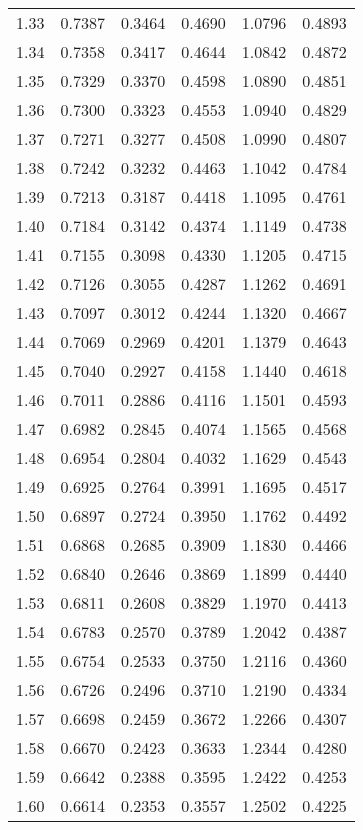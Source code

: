 \documentclass{article}
\begin{document}
\begin{longtable}{cccccc}
1.33 & 0.7387 & 0.3464 & 0.4690 & 1.0796 & 0.4893 \\
1.34 & 0.7358 & 0.3417 & 0.4644 & 1.0842 & 0.4872 \\
1.35 & 0.7329 & 0.3370 & 0.4598 & 1.0890 & 0.4851 \\
1.36 & 0.7300 & 0.3323 & 0.4553 & 1.0940 & 0.4829 \\
1.37 & 0.7271 & 0.3277 & 0.4508 & 1.0990 & 0.4807 \\
1.38 & 0.7242 & 0.3232 & 0.4463 & 1.1042 & 0.4784 \\
1.39 & 0.7213 & 0.3187 & 0.4418 & 1.1095 & 0.4761 \\
1.40 & 0.7184 & 0.3142 & 0.4374 & 1.1149 & 0.4738 \\
1.41 & 0.7155 & 0.3098 & 0.4330 & 1.1205 & 0.4715 \\
1.42 & 0.7126 & 0.3055 & 0.4287 & 1.1262 & 0.4691 \\
1.43 & 0.7097 & 0.3012 & 0.4244 & 1.1320 & 0.4667 \\
1.44 & 0.7069 & 0.2969 & 0.4201 & 1.1379 & 0.4643 \\
1.45 & 0.7040 & 0.2927 & 0.4158 & 1.1440 & 0.4618 \\
1.46 & 0.7011 & 0.2886 & 0.4116 & 1.1501 & 0.4593 \\
1.47 & 0.6982 & 0.2845 & 0.4074 & 1.1565 & 0.4568 \\
1.48 & 0.6954 & 0.2804 & 0.4032 & 1.1629 & 0.4543 \\
1.49 & 0.6925 & 0.2764 & 0.3991 & 1.1695 & 0.4517 \\
1.50 & 0.6897 & 0.2724 & 0.3950 & 1.1762 & 0.4492 \\
1.51 & 0.6868 & 0.2685 & 0.3909 & 1.1830 & 0.4466 \\
1.52 & 0.6840 & 0.2646 & 0.3869 & 1.1899 & 0.4440 \\
1.53 & 0.6811 & 0.2608 & 0.3829 & 1.1970 & 0.4413 \\
1.54 & 0.6783 & 0.2570 & 0.3789 & 1.2042 & 0.4387 \\
1.55 & 0.6754 & 0.2533 & 0.3750 & 1.2116 & 0.4360 \\
1.56 & 0.6726 & 0.2496 & 0.3710 & 1.2190 & 0.4334 \\
1.57 & 0.6698 & 0.2459 & 0.3672 & 1.2266 & 0.4307 \\
1.58 & 0.6670 & 0.2423 & 0.3633 & 1.2344 & 0.4280 \\
1.59 & 0.6642 & 0.2388 & 0.3595 & 1.2422 & 0.4253 \\
1.60 & 0.6614 & 0.2353 & 0.3557 & 1.2502 & 0.4225 \\

\end{longtable}
\end{document}
